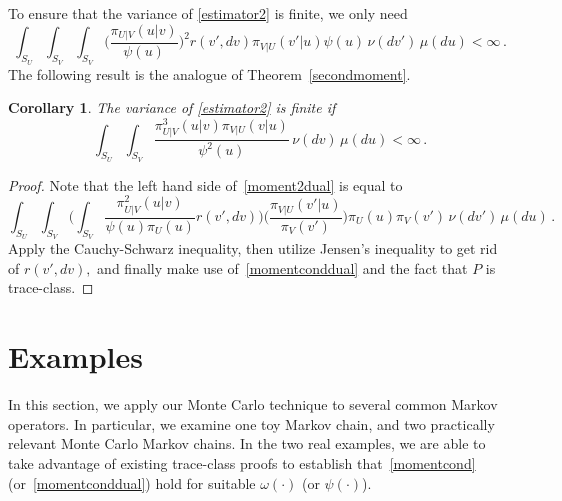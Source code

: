 \documentclass[11pt]{article}
\newtheorem{corollary}{Corollary}
\begin{document}
	To ensure that the variance of \eqref{estimator2} is finite,
        we only need
	\begin{equation} \label{moment2dual} \int_{S_U} \int_{S_V}
          \int_{S_V} \bigg(\frac{\pi_{U|V}(u|v)}{\psi(u)}\bigg)^2
          r(v',dv) \pi_{V|U}(v'|u) \psi(u) \,\nu(dv') \, \mu(du) <
          \infty \,.
	\end{equation}
	The following result is the analogue of Theorem~\ref{secondmoment}.
	\begin{corollary} \label{secondmomentdual} The variance of
          \eqref{estimator2} is finite if
          \begin{equation} \label{momentconddual} \int_{S_U}
            \int_{S_V} \frac{\pi_{U|V}^3(u|v) \pi_{V|U}(v|u)}
            {\psi^2(u)} \,\nu(dv) \, \mu(du) < \infty \,.
		\end{equation}
	\end{corollary}
	\begin{proof}
          Note that the left hand side of~\eqref{moment2dual} is equal
          to
		\[
		\int_{S_U} \int_{S_V} \bigg(\int_{S_V}
                \frac{\pi_{U|V}^2(u|v)}{\psi(u)\pi_U(u)} r(v',dv)
                \bigg) \bigg( \frac{\pi_{V|U}(v'|u)}{\pi_V(v')} \bigg)
                \pi_U(u)\pi_V(v') \,\nu(dv') \, \mu(du) \,.
		\]
		Apply the Cauchy-Schwarz inequality, then utilize
                Jensen's inequality to get rid of $r(v',dv),$ and
                finally make use of~\eqref{momentconddual} and the
                fact that $P$ is trace-class.
	\end{proof}
	
	
	\section{Examples} \label{illustration} In this section,
        we apply our Monte Carlo technique to several common Markov
        operators.  In particular, we examine one toy Markov chain,
        and two practically relevant Monte Carlo Markov chains.  In
        the two real examples, we are able to take advantage of
        existing trace-class proofs to establish
        that~\eqref{momentcond} (or~\eqref{momentconddual}) hold for
        suitable $\omega(\cdot)$ (or $\psi(\cdot)$).
	
\end{document}
